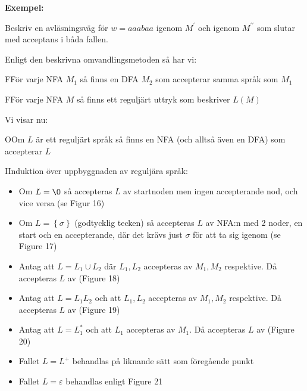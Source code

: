 \par\bigskip
\noindent\textbf{Exempel:}\par
\noindent Beskriv en avläsningsväg för $w = aaabaa$ igenom $M^{\prime}$ och igenom $M^{\prime\prime}$ som slutar med acceptans i båda fallen.
\par\bigskip
\noindent Enligt den beskrivna omvandlingsmetoden så har vi:
\par\bigskip
\begin{theo}
  FFör varje NFA $M_1$ så finns en DFA $M_2$ som accepterar samma språk som $M_1$
\end{theo}
\par\bigskip
\begin{theo}
  FFör varje NFA $M$ så finns ett reguljärt uttryk som beskriver $L(M)$
\end{theo}
\noindent Vi visar nu:
\par\bigskip
\begin{theo}
  OOm $L$ är ett reguljärt språk så finns en NFA (och alltså även en DFA) som accepterar $L$
\end{theo}
\newpage
\begin{prf}
  IInduktion över uppbyggnaden av reguljära språk:\par
  \begin{itemize}
    \item Om $L = \O$ så accepteras $L$ av startnoden men ingen accepterande nod, och vice versa (se Figur 16)
    \item Om $L = \left\{\sigma\right\}$ (godtycklig tecken) så accepteras $L$ av NFA:n med 2 noder, en start och en accepterande, där det krävs just $\sigma$ för att ta sig igenom (se Figure 17)
    \item Antag att $L =L_1\cup L_2$ där $L_1,L_2$ accepteras av $M_1,M_2$ respektive. Då accepteras $L$ av (Figure 18)
    \item Antag att $L=L_1L_2$ och att $L_1,L_2$ accepteras av $M_1,M_2$ respektive. Då accepteras $L$ av (Figure 19)
    \item Antag att $L=L_1^*$ och att $L_1$ accepteras av $M_1$. Då accepteras $L$ av (Figure 20)
    \item Fallet $L= L^+$ behandlas på liknande sätt som föregående punkt
    \item Fallet $L=\varepsilon$ behandlas enligt Figure 21
  \end{itemize}\par
\end{prf}
\begin{figure}[ht]
    \centering
    \caption{}
\end{figure}
